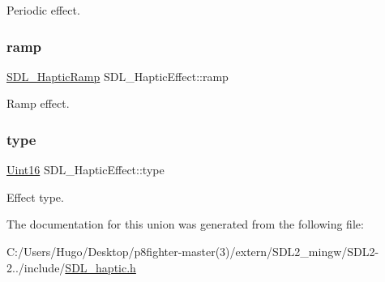 Periodic effect. \mbox{\label{union_s_d_l___haptic_effect_a1d32ef4c2d1cc89dc938b392f6ad81bd}} 
\subsubsection{\texorpdfstring{ramp}{ramp}}
{\footnotesize\ttfamily \hyperlink{struct_s_d_l___haptic_ramp}{S\+D\+L\+\_\+\+Haptic\+Ramp} S\+D\+L\+\_\+\+Haptic\+Effect\+::ramp}

Ramp effect. \mbox{\label{union_s_d_l___haptic_effect_a5ff6cfd8da91537091e9a6c2108cb179}} 
\subsubsection{\texorpdfstring{type}{type}}
{\footnotesize\ttfamily \hyperlink{_s_d_l__stdinc_8h_a31fcc0a076c9068668173ee26d33e42b}{Uint16} S\+D\+L\+\_\+\+Haptic\+Effect\+::type}

Effect type. 

The documentation for this union was generated from the following file\+:\begin{DoxyCompactItemize}
\item 
C\+:/\+Users/\+Hugo/\+Desktop/p8fighter-\/master(3)/extern/\+S\+D\+L2\+\_\+mingw/\+S\+D\+L2-\/2../include/\hyperlink{_s_d_l__haptic_8h}{S\+D\+L\+\_\+haptic.\+h}\end{DoxyCompactItemize}
